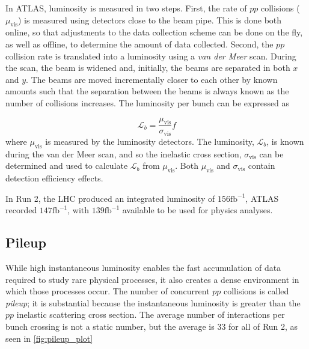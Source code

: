 In \ac{ATLAS}, luminosity is measured in two steps. First, the rate of $pp$ collisions ($\mu_{\textrm{vis}}$) is measured using detectors close to the beam pipe. This is done both online, so that adjustments to the data collection scheme can be done on the fly, as well as offline, to determine the amount of data collected. Second, the $pp$ collision rate is translated into a luminosity using a \emph{van der Meer} scan. During the scan, the beam is widened and, initially, the beams are separated in both $x$ and $y$. The beams are moved incrementally closer to each other by known amounts such that the separation between the beams is always known as the number of collisions increases. The luminosity per bunch can be expressed as

\begin{equation}
\mathcal{L}_b = \frac{\mu_{\textrm{vis}}}{\sigma_{\textrm{vis}}} f
\end{equation}
where $\mu_{\textrm{vis}}$ is measured by the luminosity detectors. The luminosity, $\mathcal{L}_b$, is known during the van der Meer scan, and so the inelastic cross section, $\sigma_{\textrm{vis}}$ can be determined and used to calculate $\mathcal{L}_b$ from $\mu_{\textrm{vis}}$. Both $\mu_{\textrm{vis}}$ and $\sigma_{\textrm{vis}}$ contain detection efficiency effects. 

In Run 2, the \ac{LHC} produced an integrated luminosity of $156 \textrm{fb}^{-1}$, \ac{ATLAS} recorded $147 \textrm{fb}^{-1}$, with $139 \textrm{fb}^{-1}$ available to be used for physics analyses.



\subsection{Pileup}

While high instantaneous luminosity enables the fast accumulation of data required to study rare physical processes, it also creates a dense environment in which those processes occur. The number of concurrent $pp$ collisions is called \emph{pileup}; it is substantial because the instantaneous luminosity is greater than the $pp$ inelastic scattering cross section. The average number of interactions per bunch crossing is not a static number, but the average is $33$ for all of Run 2, as seen in \autoref{fig:pileup_plot}

